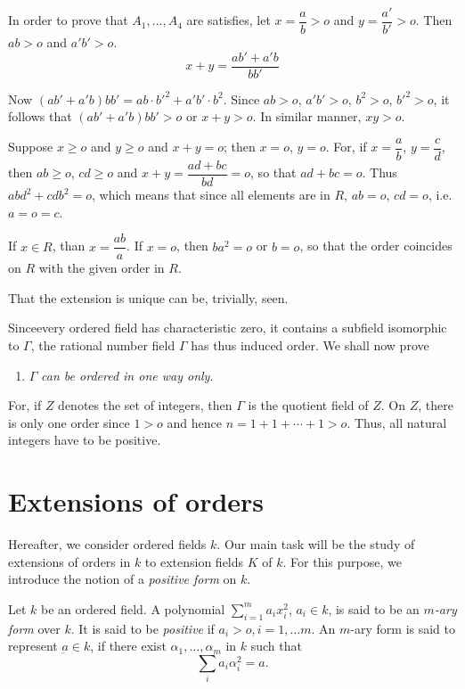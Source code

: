 In order to prove that $A_1 , \ldots, A_4$ are satisfies, let $x=
\dfrac{a}{b}> o$ and $y=  \dfrac{a'}{b'} >o$. Then  $ab >o$ and $a'b'
>o$.  
$$
x+y = \frac{ab' +a'b}{bb'}
$$  

Now $(ab' +a'b)bb'= ab \cdot b'^2 + a' b'  \cdot b^2$. Since $ab >o$, $a'b'
>o$, $b^2 >o$, $b'^2 >o$, it follows that $(ab' +a'b) bb' > o$ or $x+y
>o$. In similar manner, $xy >o$. 

Suppose  $x \ge o$ and $y \ge o$ and $x+y =o$;  then $x=o$,
$y=o$. For, if $x= \dfrac{a}{b}$, $y= \dfrac{c}{d}$, then $ab \ge o$,
$cd \ge o$ and $x+y = \dfrac{ad+bc}{bd}=o$, so that $ad+bc=o$. Thus
$ab d^2 +cd b^2 =o$, which means that since all elements are in $R$,
$ab=o$, $cd=o$, i.e. $a=o=c$. 

If $x \in R$, than $x= \dfrac{ab}{a}$. If $x=o$, then $ba^2=o$ or
$b=o$, so that the order coincides on $R$  with the given order in
$R$. 

That the extension is unique can be, trivially, seen. 

Since\pageoriginale every ordered field has characteristic zero, it
contains a subfield isomorphic to $\Gamma$, the rational number field
$\Gamma$ has thus induced order. We shall now prove 
\begin{enumerate}
\renewcommand{\labelenumi}{(\theenumi)}
\setcounter{enumi}{4}
\item $\Gamma$  \textit{can be ordered in one way only}. 
\end{enumerate}

For, if $Z$ denotes the set of integers, then $\Gamma$ is the
quotient field  of $Z$. On $Z$, there is only one order since $1 > o$
and hence $n=1+1 +\cdots + 1 >o$. Thus, all natural integers have to
be positive. 

\section{Extensions of orders}\label{c7:s2}%

Hereafter, we consider ordered fields $k$. Our main  task will be the
study of extensions of orders in $k$ to extension fields $K$ of
$k$. For this purpose, we introduce  the notion of a \textit{positive
  form} on $k$. 

Let $k$ be an ordered field. A polynomial $\sum\limits_{i=1}^m a_i 
x_i^2$, $a_i \in  k$, is said to be an  \textit{$m$-ary form} over
$k$. It is said to be \textit{positive} if $a_i > o, i=1, \ldots
m$. An $m$-ary form is said to represent $\underbar{a} \in  k$, if there
exist $\alpha_1 , \ldots , \alpha_m$ in $k$ such that   
$$
\sum_i a_i  \alpha^2_i =a.
$$

